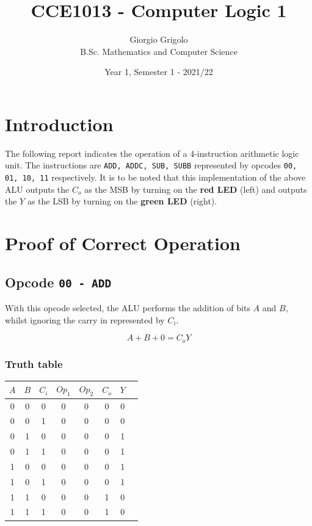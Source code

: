 \documentclass{article}
\title{CCE1013 - Computer Logic 1}
\author{Giorgio Grigolo\\{\small B.Sc. Mathematics and Computer Science}}
\date{Year 1, Semester 1 - 2021/22}
\begin{document}
\maketitle
\tableofcontents

\section{Introduction}
The following report indicates the operation of a 4-instruction arithmetic logic unit. The
instructions are \texttt{ADD, ADDC, SUB, SUBB} represented by opcodes \texttt{00, 01, 10, 11}
respectively. It is to be noted that this implementation of the above ALU outputs the $C_o$ as the MSB by 
turning on the \textbf{red LED} (left) and outputs the $Y$ as the LSB by turning on the \textbf{green LED} (right). 

\newpage

\section{Proof of Correct Operation}

\subsection{Opcode \texttt{00 - ADD}}

With this opcode selected, the ALU performs the addition of bits $A$ and $B$, whilst ignoring the
carry in represented by $C_i$.

\[A+B+0 = C_o Y\]

\vspace{9em}

\subsubsection{Truth table}

\begin{center}
	\Large
	\begin{tabular}{c|c|c||c|c||c|c|c}
		$A$ & $B$ & $C_i$ & $Op_1$ & $Op_2$ & $C_{o}$ & $Y$ \\
		\hline
		0 & 0 & 0 & 0 & 0 & 0 & 0 \\
		0 & 0 & 1 & 0 & 0 & 0 & 0 \\
		0 & 1 & 0 & 0 & 0 & 0 & 1 \\
		0 & 1 & 1 & 0 & 0 & 0 & 1 \\
		1 & 0 & 0 & 0 & 0 & 0 & 1 \\
		1 & 0 & 1 & 0 & 0 & 0 & 1 \\
		1 & 1 & 0 & 0 & 0 & 1 & 0 \\
		1 & 1 & 1 & 0 & 0 & 1 & 0 \\
	\end{tabular}
\end{center}
\end{document}
